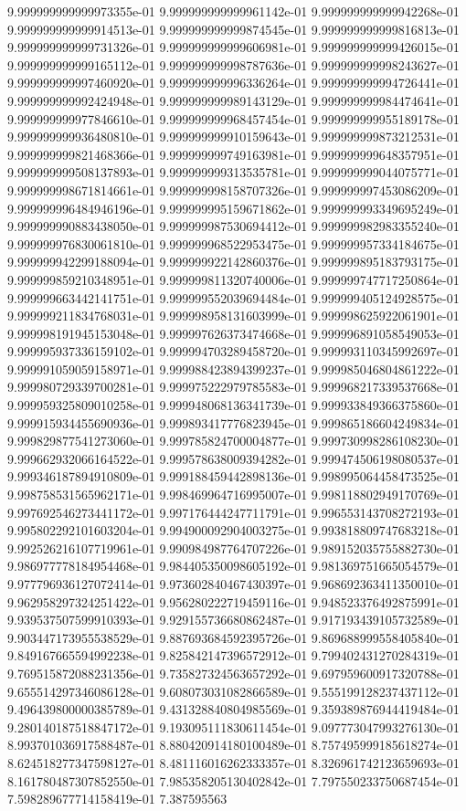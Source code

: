9.999999999999973355e-01	9.999999999999961142e-01	9.999999999999942268e-01	9.999999999999914513e-01	9.999999999999874545e-01	9.999999999999816813e-01	9.999999999999731326e-01	9.999999999999606981e-01	9.999999999999426015e-01	9.999999999999165112e-01	9.999999999998787636e-01	9.999999999998243627e-01	9.999999999997460920e-01	9.999999999996336264e-01	9.999999999994726441e-01	9.999999999992424948e-01	9.999999999989143129e-01	9.999999999984474641e-01	9.999999999977846610e-01	9.999999999968457454e-01	9.999999999955189178e-01	9.999999999936480810e-01	9.999999999910159643e-01	9.999999999873212531e-01	9.999999999821468366e-01	9.999999999749163981e-01	9.999999999648357951e-01	9.999999999508137893e-01	9.999999999313535781e-01	9.999999999044075771e-01	9.999999998671814661e-01	9.999999998158707326e-01	9.999999997453086209e-01	9.999999996484946196e-01	9.999999995159671862e-01	9.999999993349695249e-01	9.999999990883438050e-01	9.999999987530694412e-01	9.999999982983355240e-01	9.999999976830061810e-01	9.999999968522953475e-01	9.999999957334184675e-01	9.999999942299188094e-01	9.999999922142860376e-01	9.999999895183793175e-01	9.999999859210348951e-01	9.999999811320740006e-01	9.999999747717250864e-01	9.999999663442141751e-01	9.999999552039694484e-01	9.999999405124928575e-01	9.999999211834768031e-01	9.999998958131603999e-01	9.999998625922061901e-01	9.999998191945153048e-01	9.999997626373474668e-01	9.999996891058549053e-01	9.999995937336159102e-01	9.999994703289458720e-01	9.999993110345992697e-01	9.999991059059158971e-01	9.999988423894399237e-01	9.999985046804861222e-01	9.999980729339700281e-01	9.999975222979785583e-01	9.999968217339537668e-01	9.999959325809010258e-01	9.999948068136341739e-01	9.999933849366375860e-01	9.999915934455690936e-01	9.999893417776823945e-01	9.999865186604249834e-01	9.999829877541273060e-01	9.999785824700004877e-01	9.999730998286108230e-01	9.999662932066164522e-01	9.999578638009394282e-01	9.999474506198080537e-01	9.999346187894910809e-01	9.999188459442898136e-01	9.998995064458473525e-01	9.998758531565962171e-01	9.998469964716995007e-01	9.998118802949170769e-01	9.997692546273441172e-01	9.997176444247711791e-01	9.996553143708272193e-01	9.995802292101603204e-01	9.994900092904003275e-01	9.993818809747683218e-01	9.992526216107719961e-01	9.990984987764707226e-01	9.989152035755882730e-01	9.986977778184954468e-01	9.984405350098605192e-01	9.981369751665054579e-01	9.977796936127072414e-01	9.973602840467430397e-01	9.968692363411350010e-01	9.962958297324251422e-01	9.956280222719459116e-01	9.948523376492875991e-01	9.939537507599910393e-01	9.929155736680862487e-01	9.917193439105732589e-01	9.903447173955538529e-01	9.887693684592395726e-01	9.869688999558405840e-01	9.849167665594992238e-01	9.825842147396572912e-01	9.799402431270284319e-01	9.769515872088231356e-01	9.735827324563657292e-01	9.697959600917320788e-01	9.655514297346086128e-01	9.608073031082866589e-01	9.555199128237437112e-01	9.496439800000385789e-01	9.431328840804985569e-01	9.359389876944419484e-01	9.280140187518847172e-01	9.193095111830611454e-01	9.097773047993276130e-01	8.993701036917588487e-01	8.880420914180100489e-01	8.757495999185618274e-01	8.624518277347598127e-01	8.481116016262333357e-01	8.326961742123659693e-01	8.161780487307852550e-01	7.985358205130402842e-01	7.797550233750687454e-01	7.598289677714158419e-01	7.387595563